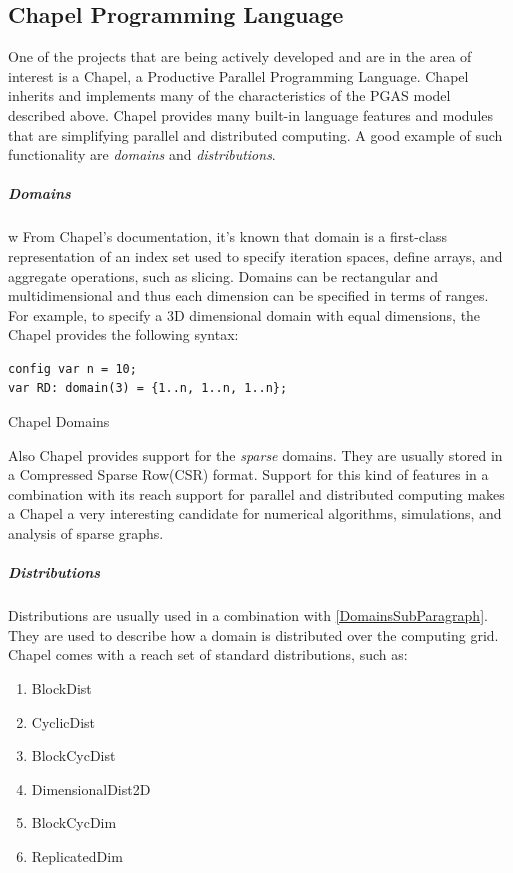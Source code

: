 \documentclass[14pt]{extreport}
\begin{document}
\subsection{Chapel Programming Language}
One of the projects that are being actively developed and are in the area of interest is a Chapel, a Productive Parallel Programming Language. Chapel inherits and implements many of the characteristics of the PGAS model described above. Chapel provides many built-in language features and modules that are simplifying parallel and distributed computing. A good example of such functionality are \textit{domains} and \textit{distributions}.
\subparagraph{Domains}w\label{DomainsSubParagraph}
From Chapel's documentation, it's known that domain is a first-class representation of an index set used to specify iteration spaces, define arrays, and aggregate operations, such as slicing. Domains can be rectangular and multidimensional and thus each dimension can be specified in terms of ranges. For example, to specify a 3D dimensional domain with equal dimensions, the Chapel provides the following syntax:

\begin{listing}[H]
\begin{verbatim}
config var n = 10;
var RD: domain(3) = {1..n, 1..n, 1..n};
\end{verbatim}
\caption{Chapel Domains}
\end{listing}

Also Chapel provides support for the \textit{sparse} domains. They are usually stored in a Compressed Sparse Row(CSR) format. Support for this kind of features in a combination with its reach support for parallel and distributed computing makes a Chapel a very interesting candidate for numerical algorithms, simulations, and analysis of sparse graphs.

\subparagraph{Distributions} Distributions are usually used in a combination with \ref{DomainsSubParagraph}. They are used to describe how a domain is distributed over the computing grid.
Chapel comes with a reach set of standard distributions, such as:

\begin{enumerate}
	\item BlockDist
	\item CyclicDist
	\item BlockCycDist
	\item DimensionalDist2D
	\item BlockCycDim
	\item ReplicatedDim
\end{enumerate}
\end{document}
